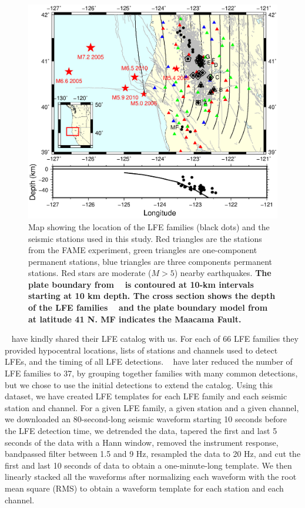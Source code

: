 \documentclass[draft]{agujournal2019}
\begin{document}
\begin{figure}
\noindent\includegraphics[width=\textwidth, trim={0.5cm 7cm 1.5cm 7cm},clip]{figures/map_LFEs.eps}
\caption{Map showing the location of the LFE families (black dots) and the seismic stations used in this study. Red triangles are the stations from the FAME experiment, green triangles are one-component permanent stations, blue triangles are three components permanent stations. Red stars are moderate ($M > 5$) nearby earthquakes. \textbf{The plate boundary from ~ is contoured at 10-km intervals starting at 10 km depth. The cross section shows the depth of the LFE families ~\cite{PLO_2015} and the plate boundary model from ~ at latitude 41 N. MF indicates the Maacama Fault.}}
\label{pngfiguresample}
\end{figure}

~ have kindly shared their LFE catalog with us. For each of 66 LFE families they provided hypocentral locations, lists of stations and channels used to detect LFEs, and the timing of all LFE detections. ~ have later reduced the number of LFE families to 37, by grouping together families with many common detections, but we chose to use the initial detections to extend the catalog. Using this dataset, we have created LFE templates for each LFE family and each seismic station and channel. For a given LFE family, a given station and a given channel, we downloaded an 80-second-long seismic waveform starting 10 seconds before the LFE detection time, we detrended the data, tapered the first and last 5 seconds of the data with a Hann window, removed the instrument response, bandpassed filter between 1.5 and 9 Hz, resampled the data to 20 Hz, and cut the first and last 10 seconds of data to obtain a one-minute-long template. We then linearly stacked all the waveforms after normalizing each waveform with the root mean square (RMS) to obtain a waveform template for each station and each channel.
\end{document}
